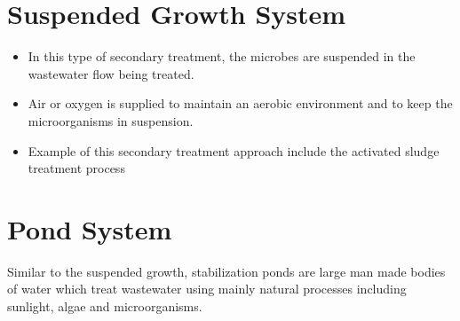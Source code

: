 \section{Suspended Growth System}
\begin{itemize}
\item In this type of secondary treatment, the microbes are suspended in the
wastewater flow being treated. 
\item Air or oxygen is supplied to maintain an aerobic environment and to keep the microorganisms in suspension. 
\item Example of this secondary treatment approach include the activated sludge treatment process 
\end{itemize}

\section{Pond System}
Similar to the suspended growth, stabilization ponds are large man made bodies of water which treat wastewater using mainly natural processes including sunlight, algae and microorganisms.


